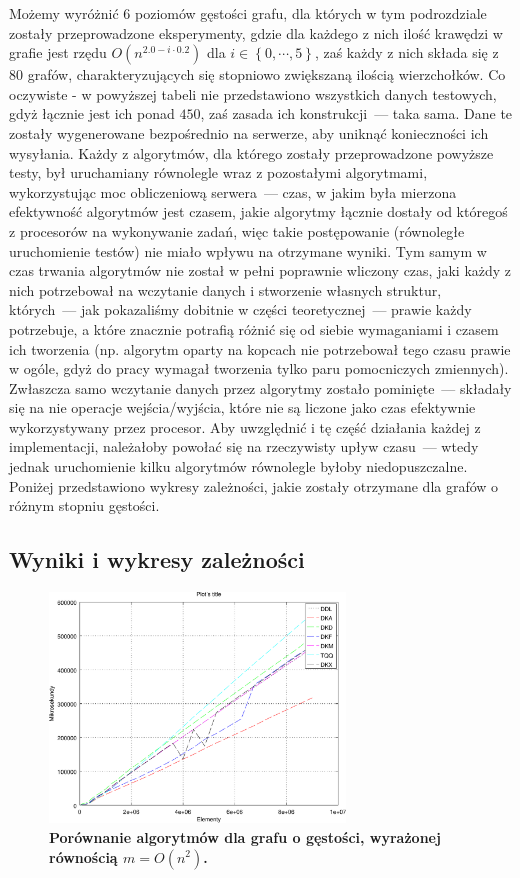 Możemy wyróżnić $6$ poziomów gęstości grafu, dla których w tym podrozdziale zostały przeprowadzone eksperymenty, gdzie dla każdego z nich ilość krawędzi w grafie jest rzędu $ O \left( n^{2.0-i \cdot 0.2} \right)$ dla $i \in \left\{ 0, \cdots, 5 \right\}$, zaś każdy z nich składa się z $80$ grafów, charakteryzujących się stopniowo zwiększaną ilością wierzchołków. Co oczywiste - w powyższej tabeli nie przedstawiono wszystkich danych testowych, gdyż łącznie jest ich ponad $450$, zaś zasada ich konstrukcji~--- taka sama. Dane te zostały wygenerowane bezpośrednio na serwerze, aby uniknąć konieczności ich wysyłania. Każdy z algorytmów, dla którego zostały przeprowadzone powyższe testy, był uruchamiany równolegle wraz z pozostałymi algorytmami, wykorzystując moc obliczeniową serwera~--- czas, w jakim była mierzona efektywność algorytmów jest czasem, jakie algorytmy łącznie dostały od któregoś z procesorów na wykonywanie zadań, więc takie postępowanie (równoległe uruchomienie testów) nie miało wpływu na otrzymane wyniki. Tym samym w czas trwania algorytmów nie został w pełni poprawnie wliczony czas, jaki każdy z nich potrzebował na wczytanie danych i stworzenie własnych struktur, których~--- jak pokazaliśmy dobitnie w części teoretycznej~--- prawie każdy potrzebuje, a które znacznie potrafią różnić się od siebie wymaganiami i czasem ich tworzenia (np. algorytm oparty na kopcach nie potrzebował tego czasu prawie w ogóle, gdyż do pracy wymagał tworzenia tylko paru pomocniczych zmiennych). Zwłaszcza samo wczytanie danych przez algorytmy zostało pominięte~--- składały się na nie operacje wejścia/wyjścia, które nie są liczone jako czas efektywnie wykorzystywany przez procesor. Aby uwzględnić i tę część działania każdej z implementacji, należałoby powołać się na rzeczywisty upływ czasu~--- wtedy jednak uruchomienie kilku algorytmów równolegle byłoby niedopuszczalne. Poniżej przedstawiono wykresy zależności, jakie zostały otrzymane dla grafów o różnym stopniu gęstości.

\subsection{Wyniki i wykresy zależności}


\begin{figure}[!htbp]
	\centering
	\includegraphics[width=0.7\textwidth]{Chapter_IV/fullGraph200.pdf}
	\caption{\textbf{ Porównanie algorytmów dla grafu o gęstości, wyrażonej równością $ m = O \left( n^{2} \right)$.}}\label{fig:plotFullGraph_2.00}
\end{figure}

